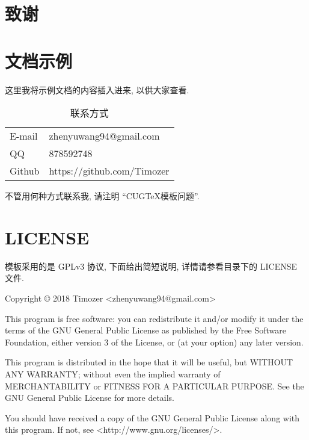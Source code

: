 \documentclass[masterpronofulltime]{cugthesis}
\begin{document}
\backmatter{}
\chapter{致谢}


\appendix
\chapter{文档示例}
\label{chapter:egdoc}

这里我将示例文档的内容插入进来, 以供大家查看.

\begin{table}[htpb]
    \centering
    \caption{联系方式}
    \label{tab:contact}
    \begin{tabular}{>{\sffamily}l>{\ttfamily\small}l}
        \toprule
        E-mail & zhenyuwang94@gmail.com \\
        QQ & 878592748 \\
        Github & https://github.com/Timozer \\
        \bottomrule 
    \end{tabular}
\end{table}

不管用何种方式联系我, 请注明 ``CUGTeX模板问题''.

\chapter{LICENSE}
\cugthesis 模板采用的是 GPLv3 协议, 下面给出简短说明, 详情请参看目录下的 LICENSE 文件.

Copyright © 2018 Timozer <zhenyuwang94@gmail.com>

This program is free software: you can redistribute it and/or modify
it under the terms of the GNU General Public License as published by
the Free Software Foundation, either version 3 of the License, or
(at your option) any later version.

This program is distributed in the hope that it will be useful,
but WITHOUT ANY WARRANTY; without even the implied warranty of
MERCHANTABILITY or FITNESS FOR A PARTICULAR PURPOSE.  See the
GNU General Public License for more details.

You should have received a copy of the GNU General Public License
along with this program.  If not, see <http://www.gnu.org/licenses/>.

\end{document}
